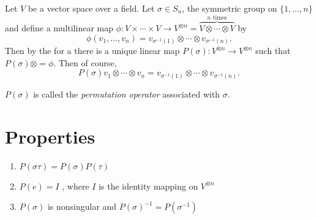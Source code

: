 \documentclass[12pt]{article}
\begin{document}
Let $V$ be a vector space over a field. Let $\sigma \in S_n$, the symmetric group on $\{1, \ldots, n\}$ and define
a multilinear map $\phi: V \times \cdots \times V \to V^{\otimes n} =\overbrace{V\otimes \cdots \otimes
V}^{n\text{ times}}$ by
$$
\phi ( v_1, \ldots , v_n ) = v_{\sigma^{-1}(1)} \otimes \cdots \otimes v_{\sigma^{-1}(n)}.
$$
Then by the  for a  there is a
unique linear map $P(\sigma) : V^{\otimes n} \to V^{\otimes n}$ such that
$P(\sigma)\otimes = \phi$. Then of course, 
$$
P(\sigma)v_1 \otimes \cdots \otimes v_n = v_{\sigma^{-1}(1)} \otimes \cdots \otimes v_{\sigma^{-1}(n)}.
$$

$P(\sigma)$ is called the \emph{permutation operator} associated with $\sigma$.

\section{Properties}
\begin{enumerate}
\item
$P(\sigma\tau) = P(\sigma)P(\tau)$
\item
$P(e) = I$ , where $I$ is the identity mapping on $V^{\otimes n}$
\item
$P(\sigma)$ is nonsingular and $P(\sigma)^{-1} = P(\sigma^{-1})$
\end{enumerate}

\end{document}
